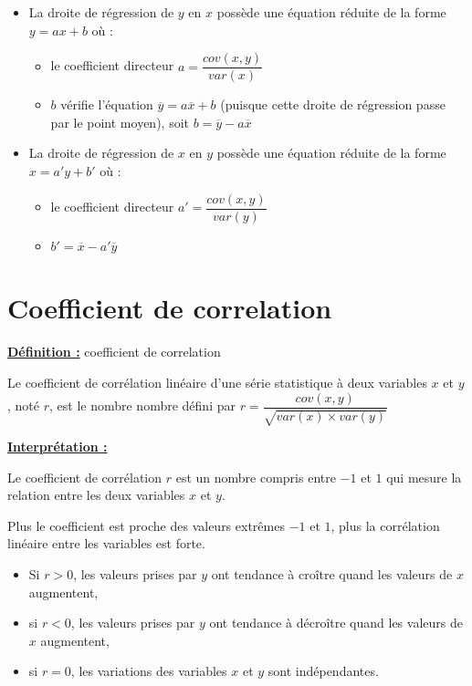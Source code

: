 \begin{itemize}[$\bullet$]
	\item La droite de régression de $y$ en $x$ possède une équation réduite de la forme $y=ax+b$ où :
	\begin{itemize}[$\hookrightarrow$]
		\item le coefficient directeur $a=\dfrac{cov(x,y)}{var(x)}$
		\item $b$ vérifie l'équation $\overline{y}=a\overline{x}+b$ (puisque cette droite
                de régression passe par le point moyen), soit $b=\overline{y}-a\overline{x}$
	\end{itemize}		
    \item La droite de régression de $x$ en $y$ possède une équation réduite de la forme $x=a'y+b'$ où :
	\begin{itemize}[$\hookrightarrow$]
		\item le coefficient directeur $a'=\dfrac{cov(x,y)}{var(y)}$
		\item $b'=\overline{x}-a'\overline{y}$
	\end{itemize}	    
\end{itemize}

\newpage



{\color{NavyBlue}\section{Coefficient de correlation}}

\begin{definition}
\underline{\bf Définition :} coefficient de correlation

\smallskip

Le coefficient de corrélation linéaire d'une série statistique à deux variables $x$ et $y$, noté $r$, est le nombre nombre défini par $r=\dfrac{cov(x,y)}{\sqrt{var(x)\times var(y)}}$
\end{definition}

\underline{\bf Interprétation :}\par \medskip

Le coefficient de corrélation $r$ est un nombre compris entre $-1$ et $1$ qui mesure la
relation entre les deux variables $x$ et $y$.

\medskip

Plus le coefficient est proche des valeurs extrêmes $-1$ et $1$, plus la corrélation linéaire entre les variables est forte.

\begin{itemize}[$\hookrightarrow$]
	\item Si $r > 0$, les valeurs prises par $y$ ont tendance à croître quand les valeurs de $x$ augmentent,
	\item si $r < 0$, les valeurs prises par $y$ ont tendance à décroître quand les valeurs de $x$ augmentent,
	\item si $r = 0$, les variations des variables $x$ et $y$ sont indépendantes.
\end{itemize}

